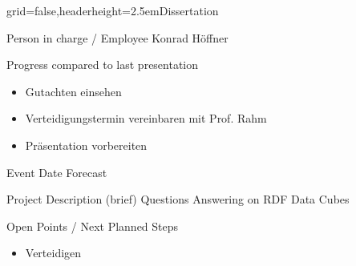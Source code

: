 \documentclass[english]{kiesgrube}
\begin{document}
\newcommand{\footer}[0]{\tikz{\draw (image.south west) node[anchor=west]{IMISE | MIG | Konrad Höffner | 2020-10-12};}}

\begin{poster}{grid=false,headerheight=2.5em}{}{Dissertation}{}{}
\begin{posterbox}[name=person,column=0,row=0]{Person in charge / Employee}
Konrad Höffner
\end{posterbox}
\begin{posterbox}[name=progress,below=person]{Progress compared to last presentation}
\begin{itemize}
\item Gutachten einsehen
\item Verteidigungstermin vereinbaren mit Prof. Rahm
\item Präsentation vorbereiten
\end{itemize}
\end{posterbox}
\begin{posterbox}[name=event,below=progress]{Event Date Forecast}
\end{posterbox}
\begin{posterbox}[name=description,column=1,row=0]{Project Description (brief)}
Questions Answering on RDF Data Cubes
\end{posterbox}
\begin{posterbox}[name=open,column=0,below=progress]{Open Points / Next Planned Steps}
\begin{itemize}
\item Verteidigen
\end{itemize}
\end{posterbox}

\end{poster}
\end{document}
